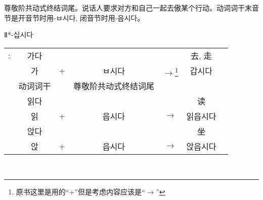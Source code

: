 \begin{grammar}
\begin{grammarsect}[\kr -ㅂ시오]
	\end{grammarsect}
	\begin{grammarsect}[\kr -(으){}ㅂ시다]
		\begin{itemize}
			\item 尊敬阶共动式终结词尾。说话人要求对方和自己一起去傲某个行动。动词词干末音节是开音节时用{\kr -ㅂ시다}, 闭音节时用{\kr -읍시다}。
			      {\color{gray} \item Ⅱ*{\kr -십시다}}
		\end{itemize}
		\begin{tabular}{ccccccc}
			\kr \ruby{例}{예}: & \kr 가다 &   &            &                                                & 去, 走      \\
			                 & \kr 가  & + & \kr ㅂ시다    & $\to$\footnote{原书这里是用的``+''但是考虑内容应该是``$\to$''} & \kr 갑시다   \\\cline{2-2}\cline{4-4}
			                 & 动词词干   &   & 尊敬阶共动式终结词尾                                                              \\
			                 & \kr 읽다 &   &            &                                                & 读         \\
			                 & \kr 읽  & + & \kr 읍시다    & $\to$                                          & \kr  읽읍시다 \\
			                 & \kr 앉다 &   &            &                                                & 坐         \\
			                 & \kr 앉  & + & \kr 읍시다    & $\to$                                          & \kr 앉읍시다
		\end{tabular}\\
	\end{grammarsect}
\end{grammar}
